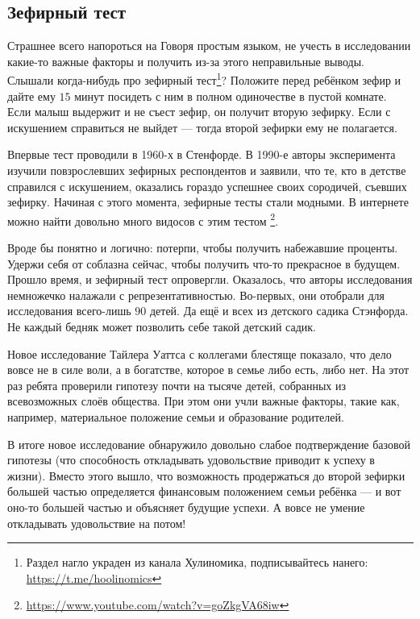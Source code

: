 \documentclass[12pt, a4paper, oneside]{article}
\begin{document}
\subsection{Зефирный тест} 

Страшнее всего напороться на  Говоря простым языком, не учесть в исследовании какие-то важные факторы и получить из-за этого неправильные выводы. Слышали когда-нибудь про зефирный тест\footnote{Раздел нагло украден из канала Хулиномика, подписывайтесь нанего: \url{https://t.me/hoolinomics}}? Положите перед ребёнком зефир и дайте ему $15$ минут посидеть с ним в полном одиночестве в пустой комнате. Если малыш выдержит и не съест зефир, он получит вторую зефирку. Если с искушением справиться не выйдет --- тогда второй зефирки ему не полагается. 

Впервые тест проводили в 1960-х в Стенфорде. В 1990-е авторы эксперимента изучили повзрослевших зефирных респондентов и заявили, что те, кто в детстве справился с искушением, оказались гораздо успешнее своих сородичей, съевших зефирку.  Начиная с этого момента, зефирные тесты стали модными. В интернете можно найти довольно много видосов с этим тестом \footnote{\url{https://www.youtube.com/watch?v=goZkgVA68iw}}.

Вроде бы понятно и логично: потерпи, чтобы получить набежавшие проценты. Удержи себя от соблазна сейчас, чтобы получить что-то прекрасное в будущем. Прошло время, и зефирный тест опровергли. Оказалось, что  авторы исследования немножечко налажали с репрезентативностью. Во-первых, они отобрали для исследования всего-лишь $90$ детей. Да ещё и всех из детского садика Стэнфорда. Не каждый бедняк может позволить себе такой детский садик. 

Новое исследование Тайлера Уаттса с коллегами блестяще показало, что дело вовсе не в силе воли, а в богатстве, которое в семье либо есть, либо нет. На этот раз ребята проверили гипотезу почти на тысяче детей, собранных из всевозможных слоёв общества. При этом они учли важные факторы, такие как, например, материальное положение семьи и образование родителей.

В итоге новое исследование обнаружило довольно слабое подтверждение базовой гипотезы (что способность откладывать удовольствие приводит к успеху в жизни). Вместо этого вышло, что возможность продержаться до второй зефирки большей частью определяется финансовым положением семьи ребёнка --- и вот оно-то большей частью и объясняет будущие успехи. А вовсе не умение откладывать удовольствие на потом!
\end{document}
